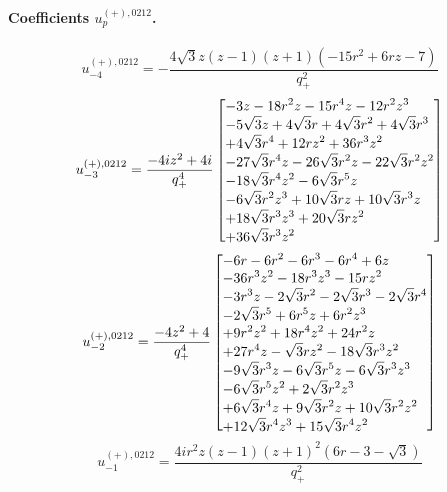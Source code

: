 \documentclass[11pt,a4paper]{article}
\begin{document}
\paragraph{Coefficients $u_p^{(+),0212}$.}
\begin{equation}
u_{-4}^{(+),0212}=- \frac{4 \sqrt{3} z \left(z - 1\right) \left(z + 1\right) \left(- 15 r^{2} + 6 r z - 7\right)}{q_{+}^{2}}
\label{eq:cat-auxiliary-plus-0212-m4}
\end{equation}
\begin{equation}
u_{-3}^{(+),0212}=\frac{- 4 i z^{2} + 4 i}{q_{+}^{4}}\left[\vcenter{\hbox{\shortstack[l]{$\displaystyle  - 3 z - 18 r^{2} z - 15 r^{4} z - 12 r^{2} z^{3}$\\
$\displaystyle  - 5 \sqrt{3} z + 4 \sqrt{3} r + 4 \sqrt{3} r^{2} + 4 \sqrt{3} r^{3}$\\
$\displaystyle  + 4 \sqrt{3} r^{4} + 12 r z^{2} + 36 r^{3} z^{2}$\\
$\displaystyle  - 27 \sqrt{3} r^{4} z - 26 \sqrt{3} r^{2} z - 22 \sqrt{3} r^{2} z^{2}$\\
$\displaystyle  - 18 \sqrt{3} r^{4} z^{2} - 6 \sqrt{3} r^{5} z$\\
$\displaystyle  - 6 \sqrt{3} r^{2} z^{3} + 10 \sqrt{3} r z + 10 \sqrt{3} r^{3} z$\\
$\displaystyle  + 18 \sqrt{3} r^{3} z^{3} + 20 \sqrt{3} r z^{2}$\\
$\displaystyle  + 36 \sqrt{3} r^{3} z^{2}$}}}\right]
\label{eq:cat-auxiliary-plus-0212-m3}
\end{equation}
\begin{equation}
u_{-2}^{(+),0212}=\frac{- 4 z^{2} + 4}{q_{+}^{4}}\left[\vcenter{\hbox{\shortstack[l]{$\displaystyle  - 6 r - 6 r^{2} - 6 r^{3} - 6 r^{4} + 6 z$\\
$\displaystyle  - 36 r^{3} z^{2} - 18 r^{3} z^{3} - 15 r z^{2}$\\
$\displaystyle  - 3 r^{3} z - 2 \sqrt{3} r^{2} - 2 \sqrt{3} r^{3} - 2 \sqrt{3} r^{4}$\\
$\displaystyle  - 2 \sqrt{3} r^{5} + 6 r^{5} z + 6 r^{2} z^{3}$\\
$\displaystyle  + 9 r^{2} z^{2} + 18 r^{4} z^{2} + 24 r^{2} z$\\
$\displaystyle  + 27 r^{4} z - \sqrt{3} r z^{2} - 18 \sqrt{3} r^{3} z^{2}$\\
$\displaystyle  - 9 \sqrt{3} r^{3} z - 6 \sqrt{3} r^{5} z - 6 \sqrt{3} r^{3} z^{3}$\\
$\displaystyle  - 6 \sqrt{3} r^{5} z^{2} + 2 \sqrt{3} r^{2} z^{3}$\\
$\displaystyle  + 6 \sqrt{3} r^{4} z + 9 \sqrt{3} r^{2} z + 10 \sqrt{3} r^{2} z^{2}$\\
$\displaystyle  + 12 \sqrt{3} r^{4} z^{3} + 15 \sqrt{3} r^{4} z^{2}$}}}\right]
\label{eq:cat-auxiliary-plus-0212-m2}
\end{equation}
\begin{equation}
u_{-1}^{(+),0212}=\frac{4 i r^{2} z \left(z - 1\right) \left(z + 1\right)^{2} \left(6 r - 3 - \sqrt{3}\right)}{q_{+}^{2}}
\label{eq:cat-auxiliary-plus-0212-m1}
\end{equation}
\end{document}
